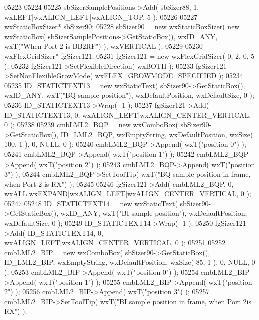 \begin{DoxyCode}
05223     
05224     
05225     sbSizerSamplePositions->Add( sbSizer88, 1, wxLEFT|wxALIGN\_LEFT|wxALIGN\_TOP, 5 );
05226     
05227     wxStaticBoxSizer* sbSizer90;
05228     sbSizer90 = \textcolor{keyword}{new} wxStaticBoxSizer( \textcolor{keyword}{new} wxStaticBox( sbSizerSamplePositions->GetStaticBox(), wxID\_ANY, 
      wxT(\textcolor{stringliteral}{"When Port 2 is BB2RF"}) ), wxVERTICAL );
05229     
05230     wxFlexGridSizer* fgSizer121;
05231     fgSizer121 = \textcolor{keyword}{new} wxFlexGridSizer( 0, 2, 0, 5 );
05232     fgSizer121->SetFlexibleDirection( wxBOTH );
05233     fgSizer121->SetNonFlexibleGrowMode( wxFLEX\_GROWMODE\_SPECIFIED );
05234     
05235     ID_STATICTEXT13 = \textcolor{keyword}{new} wxStaticText( sbSizer90->GetStaticBox(), wxID\_ANY, wxT(\textcolor{stringliteral}{"BQ sample position"}), 
      wxDefaultPosition, wxDefaultSize, 0 );
05236     ID_STATICTEXT13->Wrap( -1 );
05237     fgSizer121->Add( ID_STATICTEXT13, 0, wxALIGN\_LEFT|wxALIGN\_CENTER\_VERTICAL, 0 );
05238     
05239     cmbLML2_BQP = \textcolor{keyword}{new} wxComboBox( sbSizer90->GetStaticBox(), ID_LML2_BQP, wxEmptyString, wxDefaultPosition,
       wxSize( 100,-1 ), 0, NULL, 0 );
05240     cmbLML2_BQP->Append( wxT(\textcolor{stringliteral}{"position 0"}) );
05241     cmbLML2_BQP->Append( wxT(\textcolor{stringliteral}{"position 1"}) );
05242     cmbLML2_BQP->Append( wxT(\textcolor{stringliteral}{"position 2"}) );
05243     cmbLML2_BQP->Append( wxT(\textcolor{stringliteral}{"position 3"}) );
05244     cmbLML2_BQP->SetToolTip( wxT(\textcolor{stringliteral}{"BQ sample position in frame, when Port 2 is RX"}) );
05245     
05246     fgSizer121->Add( cmbLML2_BQP, 0, wxALL|wxEXPAND|wxALIGN\_LEFT|wxALIGN\_CENTER\_VERTICAL, 0 );
05247     
05248     ID_STATICTEXT14 = \textcolor{keyword}{new} wxStaticText( sbSizer90->GetStaticBox(), wxID\_ANY, wxT(\textcolor{stringliteral}{"BI sample position"}), 
      wxDefaultPosition, wxDefaultSize, 0 );
05249     ID_STATICTEXT14->Wrap( -1 );
05250     fgSizer121->Add( ID_STATICTEXT14, 0, wxALIGN\_LEFT|wxALIGN\_CENTER\_VERTICAL, 0 );
05251     
05252     cmbLML2_BIP = \textcolor{keyword}{new} wxComboBox( sbSizer90->GetStaticBox(), ID_LML2_BIP, wxEmptyString, wxDefaultPosition,
       wxSize( 85,-1 ), 0, NULL, 0 );
05253     cmbLML2_BIP->Append( wxT(\textcolor{stringliteral}{"position 0"}) );
05254     cmbLML2_BIP->Append( wxT(\textcolor{stringliteral}{"position 1"}) );
05255     cmbLML2_BIP->Append( wxT(\textcolor{stringliteral}{"position 2"}) );
05256     cmbLML2_BIP->Append( wxT(\textcolor{stringliteral}{"position 3"}) );
05257     cmbLML2_BIP->SetToolTip( wxT(\textcolor{stringliteral}{"BI sample position in frame, when Port 2is RX"}) );

\end{DoxyCode}
